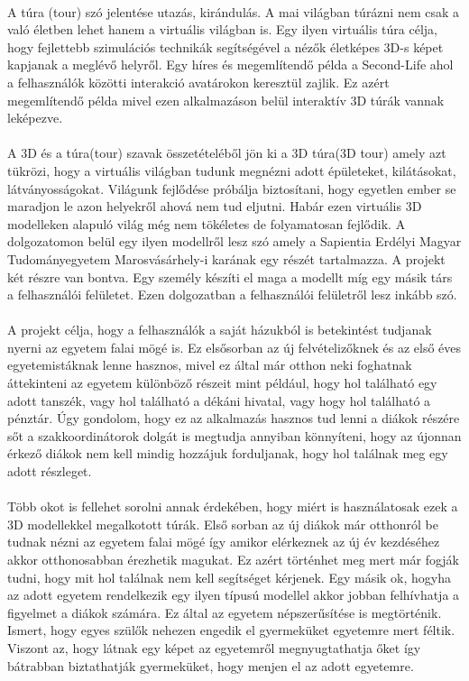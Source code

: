 \documentclass{article}
\begin{document}
	\paragraph{}
	A túra (tour) szó jelentése utazás, kirándulás. A mai világban túrázni nem csak a való életben lehet hanem a virtuális világban is. Egy ilyen virtuális túra célja, hogy fejlettebb szimulációs technikák segítségével a nézők életképes 3D-s képet kapjanak a meglévő helyről. Egy híres és megemlítendő példa a Second-Life ahol a felhasználók közötti interakció avatárokon keresztül zajlik. Ez azért megemlítendő példa mivel ezen alkalmazáson belül interaktív 3D túrák vannak leképezve.\cite{moloo20163d}
	\paragraph{}
	A 3D és a túra(tour) szavak összetételéből jön ki a 3D túra(3D tour) amely azt tükrözi, hogy a virtuális világban tudunk megnézni adott épületeket, kilátásokat, látványosságokat. Világunk fejlődése próbálja biztosítani, hogy egyetlen ember se maradjon le azon helyekről ahová nem tud eljutni. Habár ezen virtuális 3D modelleken alapuló világ még nem tökéletes de folyamatosan fejlődik. A dolgozatomon belül egy ilyen modellről lesz szó amely a Sapientia Erdélyi Magyar Tudományegyetem Marosvásárhely-i karának egy részét tartalmazza. A projekt két részre van bontva. Egy személy készíti el maga a modellt míg egy másik társ a felhasználói felületet. Ezen dolgozatban a felhasználói felületről lesz inkább szó. 
	\paragraph{}
	A projekt célja, hogy a felhasználók a saját házukból is betekintést tudjanak nyerni az egyetem falai mögé is. Ez elsősorban az új felvételizőknek és az első éves egyetemistáknak lenne hasznos, mivel ez által már otthon neki foghatnak áttekinteni az egyetem különböző részeit mint például, hogy hol található egy adott tanszék, vagy hol található a dékáni hivatal, vagy hogy hol található a pénztár. Úgy gondolom, hogy ez az alkalmazás hasznos tud lenni a diákok részére sőt a szakkoordinátorok dolgát is megtudja annyiban könnyíteni, hogy az újonnan érkező diákok nem kell mindig hozzájuk forduljanak, hogy hol találnak meg egy adott részleget.
	\paragraph{}
	Több okot is fellehet sorolni annak érdekében, hogy miért is használatosak ezek a 3D modellekkel megalkotott túrák. Első sorban az új diákok már otthonról be tudnak nézni az egyetem falai mögé így amikor elérkeznek az új év kezdéséhez akkor otthonosabban érezhetik magukat. Ez azért történhet meg mert már fogják tudni, hogy mit hol találnak nem kell segítséget kérjenek. Egy másik ok, hogyha az adott egyetem rendelkezik egy ilyen típusú modellel akkor jobban felhívhatja a figyelmet a diákok számára. Ez által az egyetem népszerűsítése is megtörténik. Ismert, hogy egyes szülők nehezen engedik el gyermeküket egyetemre mert féltik. Viszont az, hogy látnak egy  képet az egyetemről megnyugtathatja őket így bátrabban biztathatják gyermeküket, hogy menjen el az adott egyetemre. 
\end{document}
